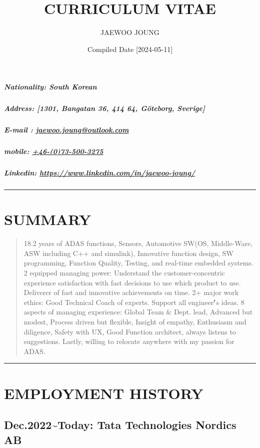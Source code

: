 \documentclass[12pt,a4paper]{article}
\title{ CURRICULUM VITAE }
\author{ JAEWOO JOUNG }
\date{ Compiled Date [2024-05-11] }
\begin{document}
\maketitle

\subparagraph{Nationality: South Korean}
\subparagraph{Address: [1301, Bangatan 36, 414 64, Göteborg, Sverige]}
\subparagraph{E-mail : \href{mailto:jaewoo.joung@outlook.com}{jaewoo.joung@outlook.com}}
\subparagraph{mobile:  \href{tel:+46-(0)73-500-3275}{+46-(0)73-500-3275}}
\subparagraph{Linkedin: \href{https://www.linkedin.com/in/jaewoo-joung/}{https://www.linkedin.com/in/jaewoo-joung/}}
\begin{quote}
\end{quote}
\rule{\textwidth}{1pt}
\section{SUMMARY}
\begin{quote}
18.2 years of ADAS functions, Sensors, Automotive SW(OS, Middle-Ware, ASW including C++ and simulink), Innovative function design, SW programming, Function Quality, Testing, and real-time embedded systems. 2 equipped managing power: Understand the customer-concentric experience satisfaction with fast decisions to use which product to use. Deliverer of fast and innovative achievements on time. 2+ major work ethics: Good Technical Coach of experts. Support all engineer\ensuremath{\rq}s ideas. 8 aspects of managing experience: Global Team \& Dept. lead, Advanced but modest, Process driven but flexible, Insight of empathy, Enthusiasm and diligence, Safety with UX, Good Function architect, always listens to suggestions. Lastly, willing to relocate anywhere with my passion for ADAS.

\end{quote}
\rule{\textwidth}{1pt}
\section{EMPLOYMENT HISTORY}
\subsection{Dec.2022{\textasciitilde}Today: Tata Technologies Nordics AB}
\end{document}

